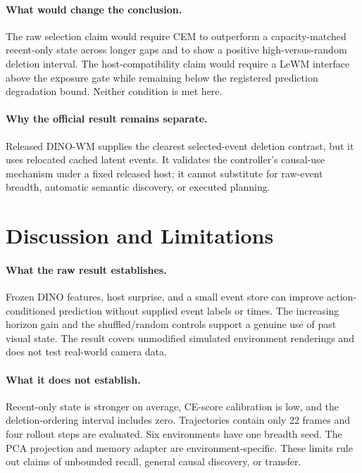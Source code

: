\paragraph{What would change the conclusion.}
The raw selection claim would require CEM to outperform a capacity-matched
recent-only state across longer gaps and to show a positive high-versus-random
deletion interval. The host-compatibility claim would require a LeWM interface
above the exposure gate while remaining below the registered prediction
degradation bound. Neither condition is met here.

\paragraph{Why the official result remains separate.}
Released DINO-WM supplies the clearest selected-event deletion contrast, but it
uses relocated cached latent events. It validates the controller's causal-use
mechanism under a fixed released host; it cannot substitute for raw-event
breadth, automatic semantic discovery, or executed planning.

\section{Discussion and Limitations}

\paragraph{What the raw result establishes.}
Frozen DINO features, host surprise, and a small event store can improve
action-conditioned prediction without supplied event labels or times. The
increasing horizon gain and the shuffled/random controls support a genuine use
of past visual state. The result covers unmodified simulated environment
renderings and does not test real-world camera data.

\paragraph{What it does not establish.}
Recent-only state is stronger on average, CE-score calibration is low, and the
deletion-ordering interval includes zero. Trajectories contain only 22 frames
and four rollout steps are evaluated. Six environments have one breadth seed.
The PCA projection and memory adapter are environment-specific. These limits
rule out claims of unbounded recall, general causal discovery, or transfer.

